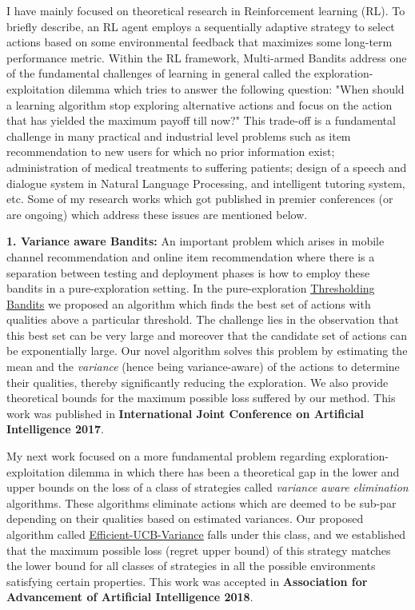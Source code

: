 \documentclass{article}
\begin{document}
I have mainly focused on theoretical research in Reinforcement learning (RL). To briefly describe, an RL agent employs a sequentially adaptive strategy to select actions based on some environmental feedback that maximizes some long-term performance metric. Within the RL framework, Multi-armed Bandits address one of the fundamental challenges of learning in general called the exploration-exploitation dilemma which tries to answer the following question: "When should a learning algorithm stop exploring alternative actions and focus on the action that has yielded the maximum payoff till now?" This trade-off is a fundamental challenge in many practical and industrial level problems such as item recommendation to new users for which no prior information exist; administration of medical treatments to suffering patients; design of a speech and dialogue system in Natural Language Processing, and intelligent tutoring system, etc. Some of my research works which got published in premier conferences (or are ongoing) which address these issues are mentioned below.


\textbf{1. Variance aware Bandits:} An important problem which arises in mobile channel recommendation and online item recommendation where there is a separation between testing and deployment phases is how to employ these bandits in a pure-exploration setting. In the pure-exploration \href{https://www.ijcai.org/proceedings/2017/0350.pdf}{\underline{\color{blue}Thresholding Bandits}} \citep{mukherjee2016} we proposed an algorithm which finds the best set of actions with qualities above a particular threshold. The challenge lies in the observation that this best set can be very large and moreover that the candidate set of actions can be exponentially large. Our novel algorithm solves this problem by estimating the mean and the \textit{variance} (hence being variance-aware) of the actions to determine their qualities, thereby significantly reducing the exploration. We also provide theoretical bounds for the maximum possible loss suffered by our
method. This work was published in \textbf{International Joint Conference on Artificial Intelligence 2017}.


My next work focused on a more fundamental problem regarding exploration-exploitation dilemma in which there has been a theoretical gap in the lower and upper bounds on the loss of a class of strategies called \textit{variance aware elimination} algorithms. These algorithms eliminate actions which are deemed to be sub-par depending on their qualities based on estimated variances. Our proposed algorithm called \href{https://www.aaai.org/ocs/index.php/AAAI/AAAI18/paper/view/16111}{\underline{\color{blue}Efficient-UCB-Variance}} \citep{mukherjee2018} falls under this class, and we established that the maximum possible loss (regret upper bound) of this strategy matches the lower bound for all classes of strategies in all the possible environments satisfying certain properties. This work was accepted in \textbf{Association for Advancement of Artificial Intelligence 2018}.
\end{document}
